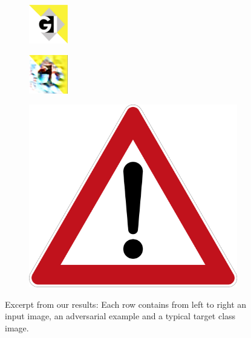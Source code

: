 \begin{figure}
\begin{subfigure}{.19\linewidth}
  \centering
  \includegraphics[width=0.7\linewidth]{imgs/gi}
\end{subfigure}
\begin{subfigure}{.19\linewidth}
  \centering
  \includegraphics[width=0.7\linewidth]{imgs/10}
\end{subfigure}
\begin{subfigure}{.19\linewidth}
  \centering
  \includegraphics[width=0.7\linewidth]{imgs/10_real}
\end{subfigure}
\caption{Excerpt from our results: Each row contains from left to right an input image, an adversarial example and a typical target class image.}
\label{fig:eyecatcher}
\end{figure}


